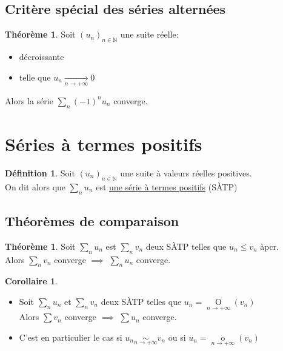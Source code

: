 \documentclass[10pt,a4paper]{article}
\theoremstyle{definition}
\newtheorem{theorem}[proposition]{Théorème}
\newtheorem{corollaire}[proposition]{Corollaire}
\newtheorem{definition}[proposition]{Définition}
\DeclareMathOperator*{\negl}{o}
\DeclareMathOperator*{\dom}{O}
\DeclareMathOperator*{\eqv}{\sim}
\begin{document}
\subsection{Critère spécial des séries alternées}
\begin{theorem}
Soit $(u_n)_{n \in \mathbb{N}}$ une suite réelle:
\begin{itemize}
\item décroissante
\item telle que $u_n \xrightarrow[n \to +\infty]{} 0$
\end{itemize}
Alors la série $\sum\limits_n (-1)^n u_n$ converge.
\end{theorem}

\section{Séries à termes positifs}
\begin{definition}
Soit $(u_n)_{n \in \mathbb{N}}$ une suite à valeurs réelles positives. \\
On dit alors que $\sum\limits_n u_n$ est \uline{une série à termes positifs} (SÀTP)
\end{definition}

\subsection{Théorèmes de comparaison}
\begin{theorem}
Soit $\sum\limits_n u_n$ est $\sum\limits_n v_n$ deux SÀTP telles que $u_n \leq v_n$ àpcr. \\
Alors $\sum\limits_n v_n$ converge $\implies$ $\sum\limits_n u_n$ converge. 
\end{theorem}

\pagebreak

\begin{corollaire}
\hfill
\begin{itemize}
\item Soit $\sum\limits_n u_n$ et $\sum\limits_n v_n$ deux SÀTP telles que $u_n = \dom\limits_{n \to +\infty} (v_n)$ \\
Alors $\sum v_n$ converge $\implies$ $\sum u_n$ converge.
\item C'est en particulier le cas si $u_n \eqv\limits_{n \to +\infty} v_n$ ou si $u_n = \negl\limits_{n \to +\infty} (v_n)$
\end{itemize}
\end{corollaire}
\end{document}

